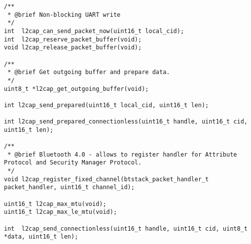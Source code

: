 \begin{lstlisting}
/** 
 * @brief Non-blocking UART write
 */
int  l2cap_can_send_packet_now(uint16_t local_cid);    
int  l2cap_reserve_packet_buffer(void);
void l2cap_release_packet_buffer(void);

/** 
 * @brief Get outgoing buffer and prepare data.
 */
uint8_t *l2cap_get_outgoing_buffer(void);

int l2cap_send_prepared(uint16_t local_cid, uint16_t len);

int l2cap_send_prepared_connectionless(uint16_t handle, uint16_t cid, uint16_t len);

/** 
 * @brief Bluetooth 4.0 - allows to register handler for Attribute Protocol and Security Manager Protocol.
 */
void l2cap_register_fixed_channel(btstack_packet_handler_t packet_handler, uint16_t channel_id);

uint16_t l2cap_max_mtu(void);
uint16_t l2cap_max_le_mtu(void);

int  l2cap_send_connectionless(uint16_t handle, uint16_t cid, uint8_t *data, uint16_t len);
\end{lstlisting}
\pagebreak
